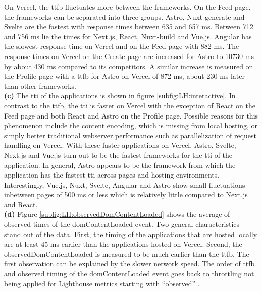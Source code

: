 \documentclass[a4paper, 12pt]{article}
\begin{document}
On Vercel, the \acrshort{ttfb} fluctuates more between the frameworks.
On the Feed page, the frameworks can be separated into three groups.
Astro, Nuxt-generate and Svelte are the fastest with response times between 635 and 657 ms.
Between 712 and 756 ms lie the times for Next.js, React, Nuxt-build and Vue.js.
Angular has the slowest response time on Vercel and on the Feed page with 882 ms.
The response times on Vercel on the Create page are increased for Astro to 10730 ms by about 430 ms compared to its competitors.
A similar increase is measured on the Profile page with a \acrshort{ttfb} for Astro on Vercel of 872 ms, about 230 ms later than other frameworks.
\\

\textbf{(c)} The \acrlong{tti} of the applications is shown in figure \ref{subfig:LH:interactive}. In contrast to the \acrshort{ttfb}, the \acrshort{tti} is faster on Vercel with the exception of React on the Feed page and both React and Astro on the Profile page.
Possible reasons for this phenomenon include the content encoding, which is missing from local hosting, or simply better traditional webserver performance such as parallelization of request handling on Vercel.
With these faster applications on Vercel, Astro, Svelte, Next.js and Vue.js turn out to be the fastest frameworks for the \acrlong{tti} of the application.
In general, Astro appears to be the framework from which the application has the fastest \acrshort{tti} across pages and hosting environments.
Interestingly, Vue.js, Nuxt, Svelte, Angular and Astro show small fluctuations inbetween pages of 500 ms or less which is relatively little compared to Next.js and React.
\\

\textbf{(d)} Figure \ref{subfig:LH:observedDomContentLoaded} shows the average of observed times of the domContentLoaded event.
Two general characteristics stand out of the data.
First, the timing of the applications that are hosted locally are at least 45 ms earlier than the applications hosted on Vercel.
Second, the observedDomContentLoaded is measured to be much earlier than the \acrshort{ttfb}.
The first observation can be explained by the slower network speed.
The order of \acrshort{ttfb} and observed timing of the domContentLoaded event goes back to throttling not being applied for Lighthouse metrics starting with \enquote{observed} \citep{observedMetrics}.
\end{document}
